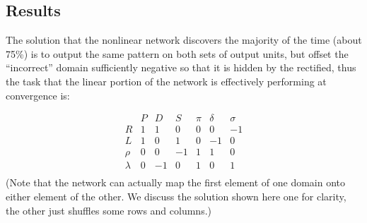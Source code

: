 \documentclass[10pt,letterpaper]{article}
\begin{document}
\subsection{Results}
The solution that the nonlinear network discovers the majority of the time (about 75\%) is to output the same pattern on both sets of output units, but offset the ``incorrect'' domain sufficiently negative so that it is hidden by the rectified, thus the task that the linear portion of the network is effectively performing at convergence is: \par
\vspace{-0.25em}
{ 
\[
\begin{array}{c|cccccc} 
& P & D & S & \pi & \delta & \sigma \\
\hline
R & 1 & 1 & 0 & 0 & 0 & -1 \\
L & 1 & 0 & 1 & 0 & -1 & 0 \\
\rho & 0 & 0 & -1 & 1 & 1 & 0\\
\lambda & 0 & -1 & 0 & 1 & 0 & 1\\
\end{array} 
\]
}
(Note that the network can actually map the first element of one domain onto either element of the other. We discuss the solution shown here one for clarity, the other just shuffles some rows and columns.) \par 
\end{document}
